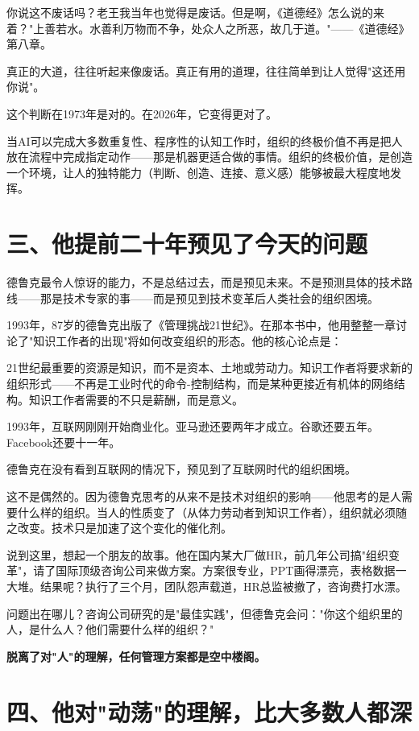 你说这不废话吗？老王我当年也觉得是废话。但是啊，《道德经》怎么说的来着？"上善若水。水善利万物而不争，处众人之所恶，故几于道。"——《道德经》第八章。

真正的大道，往往听起来像废话。真正有用的道理，往往简单到让人觉得"这还用你说"。

这个判断在1973年是对的。在2026年，它变得更对了。

当AI可以完成大多数重复性、程序性的认知工作时，组织的终极价值不再是把人放在流程中完成指定动作——那是机器更适合做的事情。组织的终极价值，是创造一个环境，让人的独特能力（判断、创造、连接、意义感）能够被最大程度地发挥。


\section{三、他提前二十年预见了今天的问题}


德鲁克最令人惊讶的能力，不是总结过去，而是预见未来。不是预测具体的技术路线——那是技术专家的事——而是预见到技术变革后人类社会的组织困境。

1993年，87岁的德鲁克出版了《管理挑战21世纪》。在那本书中，他用整整一章讨论了"知识工作者的出现"将如何改变组织的形态。他的核心论点是：

21世纪最重要的资源是知识，而不是资本、土地或劳动力。知识工作者将要求新的组织形式——不再是工业时代的命令-控制结构，而是某种更接近有机体的网络结构。知识工作者需要的不只是薪酬，而是意义。

1993年，互联网刚刚开始商业化。亚马逊还要两年才成立。谷歌还要五年。Facebook还要十一年。

德鲁克在没有看到互联网的情况下，预见到了互联网时代的组织困境。

这不是偶然的。因为德鲁克思考的从来不是技术对组织的影响——他思考的是人需要什么样的组织。当人的性质变了（从体力劳动者到知识工作者），组织就必须随之改变。技术只是加速了这个变化的催化剂。

说到这里，想起一个朋友的故事。他在国内某大厂做HR，前几年公司搞"组织变革"，请了国际顶级咨询公司来做方案。方案很专业，PPT画得漂亮，表格数据一大堆。结果呢？执行了三个月，团队怨声载道，HR总监被撤了，咨询费打水漂。

问题出在哪儿？咨询公司研究的是"最佳实践"，但德鲁克会问："你这个组织里的人，是什么人？他们需要什么样的组织？"

\textbf{脱离了对"人"的理解，任何管理方案都是空中楼阁。}


\section{四、他对"动荡"的理解，比大多数人都深}



